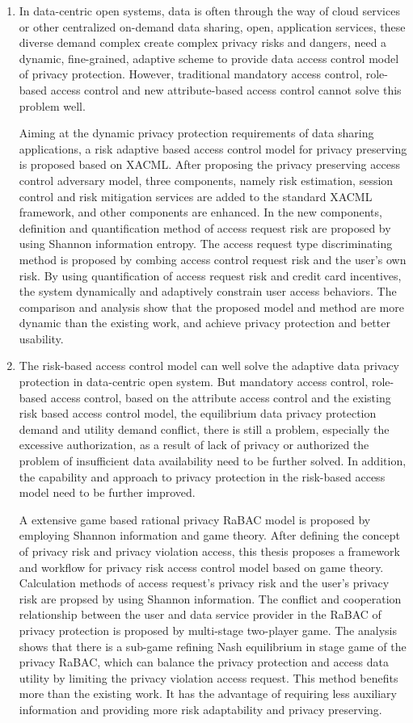 \documentclass[pdftex,notypeinfo,twoside,openany,UTF8,fntef]{CASthesis}
\theoremstyle{THrm}{
	\newtheorem{question}{Question}[section]
	\newtheorem{property}{性质}[section]
	\newtheorem{assumption}{假设}[section]
	\newtheorem{claim}[lemma]{断言}
	
}
\begin{document}
\begin{enumerate}
	\item 
	In data-centric open systems, data is often through the way of cloud services or other centralized on-demand data sharing, open, application services, these diverse demand complex create complex privacy risks and dangers, need a dynamic, fine-grained, adaptive scheme to provide data access control model of privacy protection. However, traditional mandatory access control, role-based access control and new attribute-based access control cannot solve this problem well.
		
	Aiming at the dynamic privacy protection requirements of data sharing applications, a risk adaptive based access control model for privacy preserving is proposed based on XACML. After proposing the privacy preserving access control adversary model, three components, namely risk estimation, session control and risk mitigation services are added to the standard XACML framework, and other components are enhanced. In the new components, definition and quantification method of access request risk are proposed by using Shannon information entropy.  The access request type discriminating method is proposed by combing access control request risk  and the user's own risk. By using quantification of access request risk and  credit card incentives, the system dynamically and adaptively constrain user access behaviors. The comparison and analysis show that the proposed model and method are more dynamic than the existing work, and achieve privacy protection and better usability.
	
	\item 	
	The risk-based access control model can well solve the adaptive data privacy protection in data-centric open system. But mandatory access control, role-based access control, based on the attribute access control and the existing risk based access control model, the equilibrium data privacy protection demand and utility demand conflict, there is still a problem, especially the excessive authorization, as a result of lack of privacy or authorized the problem of insufficient data availability need to be further solved. In addition, the capability and approach to privacy protection in the risk-based access model need to be further improved.
		
	A extensive game based rational privacy RaBAC model is proposed by employing Shannon information and game theory. After defining the concept of privacy risk and privacy violation access, this thesis proposes a framework and workflow for privacy risk access control model based on game theory. Calculation methods of access request's privacy risk and  the user's privacy risk are propsed by using Shannon information.
	The conflict and cooperation relationship between the user and data service provider in the RaBAC of privacy protection is proposed by multi-stage two-player game. The analysis shows that there is a sub-game refining Nash equilibrium in stage game of the privacy RaBAC, which can balance the privacy protection and access data utility by limiting the privacy violation access request. This method benefits more than the existing work. It has the advantage of requiring less auxiliary information and providing more risk adaptability and privacy preserving.
	

\end{enumerate}
\end{document}
